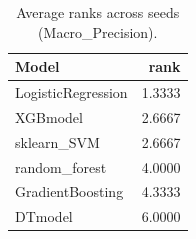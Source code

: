 \begin{table}[t]
\centering
\begin{tabular}{lr}
\toprule
Model & rank \\
\midrule
LogisticRegression & 1.3333 \\
XGBmodel & 2.6667 \\
sklearn_SVM & 2.6667 \\
random_forest & 4.0000 \\
GradientBoosting & 4.3333 \\
DTmodel & 6.0000 \\
\bottomrule
\end{tabular}
\caption{Average ranks across seeds (Macro_Precision).}
\label{tab:avg_rank_Macro_Precision}
\end{table}